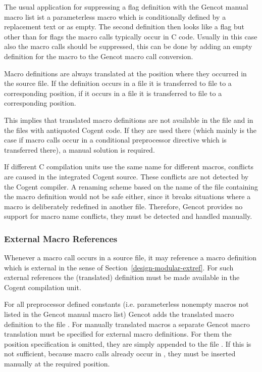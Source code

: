 The usual application for suppressing a flag definition with the Gencot manual macro list ist a parameterless macro
which is conditionally defined by a replacement text or as empty. The second definition then looks like a flag but
other than for flags the macro calls typically occur in C code. Usually in this case also the macro calls should
be suppressed, this can be done by adding an empty definition for the macro to the Gencot macro call conversion.

Macro definitions are always translated at the position where they occurred in the source file.
If the definition occurs in a file  it is transferred to file  to a corresponding position,
if it occurs in a file  it is transferred to file  to a corresponding position.

This implies that translated macro definitions are not available in the file  and in the files with
antiquoted Cogent code. If they are used there (which mainly is the case if macro calls occur in a conditional
preprocessor directive which is transferred there), a manual solution is required.

If different C compilation units use the same name for different macros, conflicts are caused in the integrated Cogent
source. These conflicts are not detected by the Cogent compiler. A renaming scheme based on the name of the file 
containing the macro definition would not be safe either, since it breaks situations where a macro is deliberately
redefined in another file. Therefore, Gencot provides no support for macro name conflicts, they must be detected and
handled manually.

\subsubsection{External Macro References}

Whenever a macro call occurs in a source file, it may reference a macro definition which is external in 
the sense of Section~\ref{design-modular-extref}. For such external references the (translated) definition 
must be made available in the Cogent compilation unit.

For all preprocessor defined constants (i.e. parameterless nonempty macros not listed in the Gencot manual 
macro list) Gencot adds the translated macro definition to the file . For
manually translated macros a separate Gencot macro translation must be specified for external macro definitions.
For them the position specification is omitted, they are simply appended to the file 
. If this is not sufficient, because macro calls already occur in 
, they must be inserted manually at the required position.

